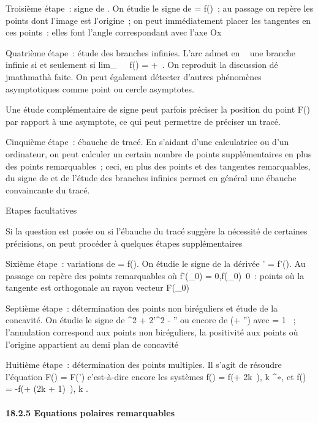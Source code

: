 \documentclass[]{article}
\begin{document}
Troisième étape~: signe de \rho. On étudie le signe de \rho = f(\theta)~; au
passage on repère les points dont l'image est l'origine~; on peut
immédiatement placer les tangentes en ces points~: elles font l'angle
correspondant avec l'axe Ox

Quatrième étape~: étude des branches infinies. L'arc admet en \alpha~
\in\overlineD une branche infinie si et seulement si
lim_\theta\rightarrow~\alpha~~f(\theta) = +\infty~.
On reproduit la discussion dé\\jmathmathà faite. On peut également détecter
d'autres phénomènes asymptotiques comme point ou cercle asymptotes.

Une étude complémentaire de signe peut parfois préciser la position du
point F(\theta) par rapport à une asymptote, ce qui peut permettre de
préciser un tracé.

Cinquième étape~: ébauche de tracé. En s'aidant d'une calculatrice ou
d'un ordinateur, on peut calculer un certain nombre de points
supplémentaires en plus des points remarquables~; ceci, en plus des
points et des tangentes remarquables, du signe de \rho et de l'étude des
branches infinies permet en général une ébauche convaincante du tracé.

Etapes facultatives

Si la question est posée ou si l'ébauche du tracé suggère la nécessité
de certaines précisions, on peut procéder à quelques étapes
supplémentaires

Sixième étape~: variations de \rho = f(\theta). On étudie le signe de la dérivée
\rho' = f'(\theta). Au passage on repère des points remarquables où
f'(\theta_0) = 0,f(\theta_0)\neq~0~:
points où la tangente est orthogonale au rayon vecteur F(\theta_0)

Septième étape~: détermination des points non biréguliers et étude de la
concavité. On étudie le signe de \rho^2 + 2\rho'^2 -
\rho\rho'' ou encore de \phi(\phi + \phi'') avec \phi = 1 \over \rho ~;
l'annulation correspond aux points non biréguliers, la positivité aux
points où l'origine appartient au demi plan de concavité

Huitième étape~: détermination des points multiples. Il s'agit de
résoudre l'équation F(\theta) = F(\theta') c'est-à-dire encore les systèmes f(\theta) =
f(\theta + 2k\pi~), k \in {}^∗, et f(\theta) = -f(\theta + (2k + 1)\pi~), k \in {}.

\paragraph{18.2.5 Equations polaires remarquables}
\end{document}
